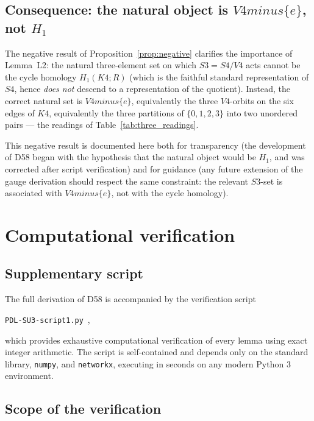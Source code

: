\documentclass[11pt,a4paper]{article}
\def\Sfour{S4}%
\def\Vfour{V4}%
\def\Sthree{S3}%
\def\Kfour{K4}%
\def\setminus{ minus }%
\def\_{-}%
\def\RR{R}%
\def\mathbb#1{#1}%
\theoremstyle{plain}
\theoremstyle{definition}
\theoremstyle{remark}
\newcommand{\Kfour}{K_4}
\newcommand{\Sfour}{S_4}
\newcommand{\Vfour}{V_4}
\newcommand{\Sthree}{S_3}
\newcommand{\RR}{\mathbb{R}}
\begin{document}
\subsection{Consequence: the natural object is \texorpdfstring{$\Vfour \setminus \{e\}$}{V4 minus e}, not \texorpdfstring{$H_1$}{H1}}

The negative result of Proposition~\ref{prop:negative} clarifies the importance of Lemma~L2: the natural three-element set on which $\Sthree = \Sfour/\Vfour$ acts cannot be the cycle homology $H_1(\Kfour;\RR)$ (which is the faithful standard representation of $\Sfour$, hence \emph{does not} descend to a representation of the quotient). Instead, the correct natural set is $\Vfour \setminus \{e\}$, equivalently the three $\Vfour$-orbits on the six edges of $\Kfour$, equivalently the three partitions of $\{0,1,2,3\}$ into two unordered pairs --- the readings of Table~\ref{tab:three_readings}.

This negative result is documented here both for transparency (the development of D58 began with the hypothesis that the natural object would be $H_1$, and was corrected after script verification) and for guidance (any future extension of the gauge derivation should respect the same constraint: the relevant $\Sthree$-set is associated with $\Vfour \setminus \{e\}$, not with the cycle homology).

\section{Computational verification}
\label{sec:verification}

\subsection{Supplementary script}

The full derivation of D58 is accompanied by the verification script
\begin{center}
\texttt{PDL\_SU3\_script1.py}~\cite{PDL_SU3_script1},
\end{center}
which provides exhaustive computational verification of every lemma using exact integer arithmetic. The script is self-contained and depends only on the standard library, \texttt{numpy}, and \texttt{networkx}, executing in seconds on any modern Python 3 environment.

\subsection{Scope of the verification}
\end{document}
